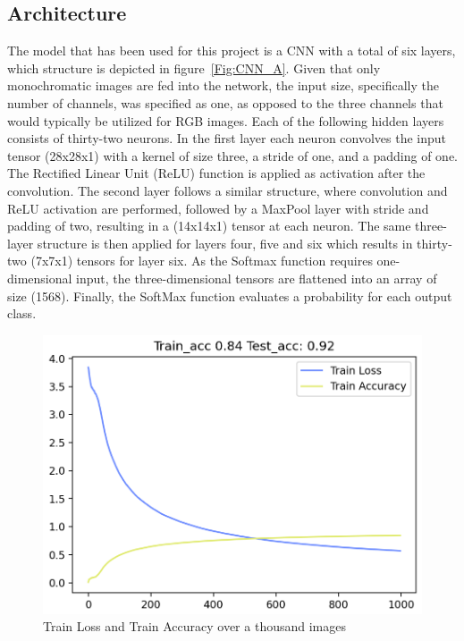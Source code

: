 \documentclass[@CLASSOPTIONS@]{tumarticle}
\begin{document}
\subsection{Architecture}

The model that has been used for this project is a CNN with a total of six layers, which structure is depicted in
figure~\ref{Fig:CNN_A}.
Given that only monochromatic images are fed into the network, the input size, specifically the number of channels,
was specified as one, as opposed to the three channels that would typically be utilized for RGB images.
Each of the following hidden layers consists of thirty-two neurons.
In the first layer each neuron convolves the input tensor (28x28x1) with a kernel of size three, a stride of one, and
a padding of one.
The Rectified Linear Unit (ReLU) function is applied as activation after the convolution.
The second layer follows a similar structure, where convolution and ReLU activation are performed, followed by a MaxPool
layer with stride and padding of two, resulting in a (14x14x1) tensor at each neuron.
The same three-layer structure is then applied for layers four, five and six which results in thirty-two (7x7x1) tensors for
layer six.
As the Softmax function requires one-dimensional input, the three-dimensional tensors are flattened into an array of size (1568).
Finally, the SoftMax function evaluates a probability for each output class.

\begin{figure}
    \begin{minipage}{0.48\textwidth}
     \centering
     \includegraphics[width=.9\linewidth]{figures/train_plot}
     \caption{Train Loss and Train Accuracy over a thousand images}\label{Fig:tp}
   \end{minipage}
\end{figure}
\end{document}
